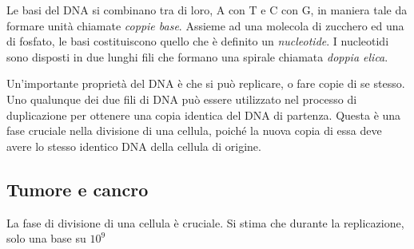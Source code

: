 Le basi del DNA si combinano tra di loro, A con T e C con G, in maniera tale da formare unità chiamate \textit{coppie base}. Assieme ad una molecola di zucchero ed una di fosfato, le basi costituiscono quello che è definito un \textit{nucleotide}. I nucleotidi sono disposti in due lunghi fili che formano una spirale chiamata \textit{doppia elica}.

Un'importante proprietà del DNA è che si può replicare, o fare copie di se stesso. Uno qualunque dei due fili di DNA \cite{WhatisDN79:online} può essere utilizzato nel processo di duplicazione per ottenere una copia identica del DNA di partenza. Questa è una fase cruciale nella divisione di una cellula, poiché la nuova copia di essa deve avere lo stesso identico DNA della cellula di origine.

\subsection{Tumore e cancro}

La fase di divisione di una cellula è cruciale. Si stima che durante la replicazione, solo una base su $10^9$ \cite{DNAReplication}